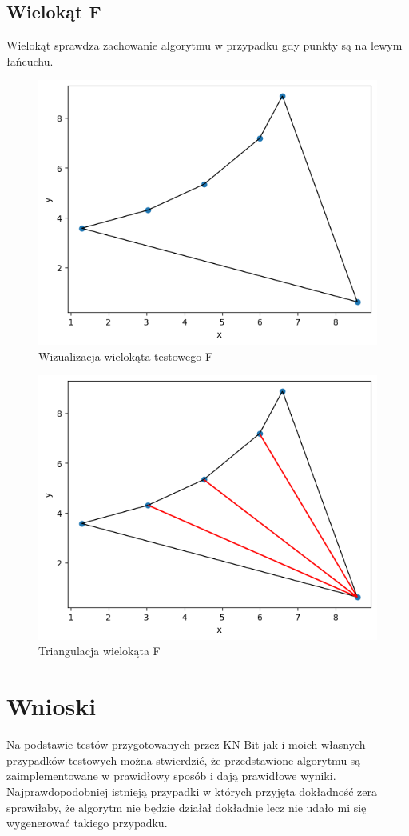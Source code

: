 \documentclass[a4paper]{article}
\begin{document}
    \subsection{Wielokąt F}
    Wielokąt sprawdza zachowanie algorytmu w przypadku gdy punkty są na lewym łańcuchu.
    \begin{figure}[H]
        \centering
        \includegraphics[width=.65\textwidth]{test_f_poly.png}
        \caption{Wizualizacja wielokąta testowego F}
        \label{fig:test_f_poly}
    \end{figure}
    \begin{figure}[H]
        \centering
        \includegraphics[width=.65\textwidth]{test_f_tri.png}
        \caption{Triangulacja wielokąta F}
        \label{fig:test_f_tri}
    \end{figure}
    

\section{Wnioski}
Na podstawie testów przygotowanych przez KN Bit jak i moich własnych przypadków testowych
można stwierdzić, że przedstawione algorytmu są zaimplementowane w prawidłowy sposób i 
dają prawidłowe wyniki. Najprawdopodobniej istnieją przypadki w których przyjęta dokładność
zera sprawiłaby, że algorytm nie będzie działał dokładnie lecz nie udało mi się wygenerować
takiego przypadku.
\end{document}
